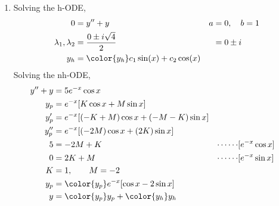 \begin{enumerate}
    \item Solving the h-ODE,
          \begin{align}
              0                        & = y'' + y                                 &
              a                        & = 0, \quad b = 1                            \\
              \lambda_{1}, \lambda_{2} & = \frac{0 \pm i\sqrt{4}}{2}               &
                                       & = 0 \pm i                                   \\
              y_{h}                    & = \color{y_h} c_{1}\sin(x) + c_{2}\cos(x)
          \end{align}
          Solving the nh-ODE,
          \begin{align}
              y'' + y      & = 5e^{-x}\cos x                               \\
              y_{p}        & = e^{-x}[K \cos x + M \sin x]                 \\
              y_{p}'       & = e^{-x}[(-K + M) \cos x + (-M - K) \sin x]   \\
              y_{p}''      & = e^{-x}[(-2M) \cos x + (2K) \sin x]          \\
              5            & = -2M + K                                   &
              \cdots\cdots & [e^{-x}\cos x]                                \\
              0            & = 2K + M                                    &
              \cdots\cdots & [e^{-x}\sin x]                                \\
              K            & = 1, \qquad M = -2                            \\
              y_{p}        & = \color{y_p} e^{-x}[\cos x - 2\sin x]        \\
              y            & = {\color{y_p} y_{p}} + {\color{y_h} y_{h}}
          \end{align}


\end{enumerate}
